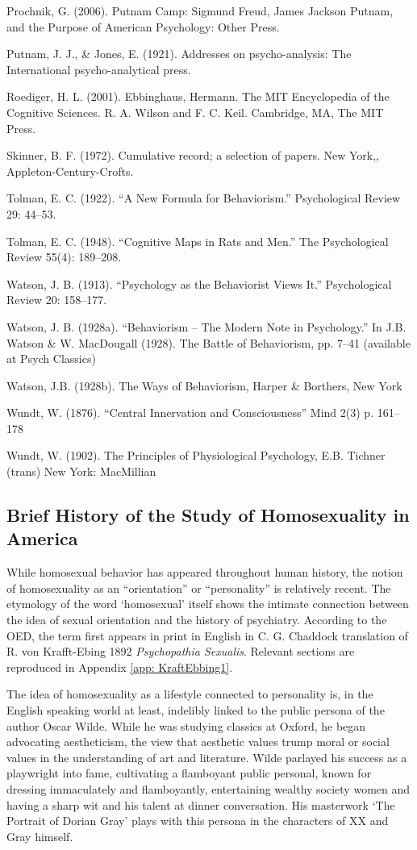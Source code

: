 Prochnik, G. (2006). Putnam Camp: Sigmund Freud, James Jackson Putnam, and the Purpose of American Psychology: Other Press.

Putnam, J. J., \& Jones, E. (1921). Addresses on psycho-analysis: The International psycho-analytical press.

Roediger, H. L. (2001). Ebbinghaus, Hermann. The MIT Encyclopedia of the Cognitive Sciences. R. A. Wilson and F. C. Keil. Cambridge, MA, The MIT Press.

Skinner, B. F. (1972). Cumulative record; a selection of papers. New York,, Appleton-Century-Crofts.

Tolman, E. C. (1922). ``A New Formula for Behaviorism.'' Psychological Review 29: 44--53.

Tolman, E. C. (1948). ``Cognitive Maps in Rats and Men.'' The Psychological Review 55(4): 189--208.

Watson, J. B. (1913). ``Psychology as the Behaviorist Views It.'' Psychological Review 20: 158--177.

Watson, J. B. (1928a). ``Behaviorism -- The Modern Note in Psychology.'' In J.B. Watson \& W. MacDougall (1928). The Battle of Behaviorism, pp. 7--41 (available at Psych Classics)

Watson, J.B. (1928b). The Ways of Behaviorism, Harper \& Borthers, New York

Wundt, W. (1876). ``Central Innervation and Consciousness'' Mind 2(3) p. 161--178

Wundt, W. (1902). The Principles of Physiological Psychology, E.B. Tichner (trans) New York: MacMillian

\subsection{Brief History of the Study of Homosexuality in America}
\label{briefhistoryofthestudyofhomosexualityinamerica}

While homosexual behavior has appeared throughout human history, the notion of homosexuality as an ``orientation'' or ``personality'' is relatively recent. The etymology of the word `homosexual' itself shows the intimate connection between the idea of sexual orientation and the history of psychiatry. According to the OED, the term first appears in print in English in C. G. Chaddock translation of R. von Krafft-Ebing 1892 \emph{Psychopathia Sexualis}. Relevant sections are reproduced in Appendix \ref{app: KraftEbbing1}.

The idea of homosexuality as a lifestyle connected to personality is, in the English speaking world at least, indelibly linked to the public persona of the author Oscar Wilde. While he was studying classics at Oxford, he began advocating aestheticism, the view that aesthetic values trump moral or social values in the understanding of art and literature. Wilde parlayed his success as a playwright into fame, cultivating a flamboyant public personal, known for dressing immaculately and flamboyantly, entertaining wealthy society women and having a sharp wit and his talent at dinner conversation. His masterwork `The Portrait of Dorian Gray' plays with this persona in the characters of XX and Gray himself.

